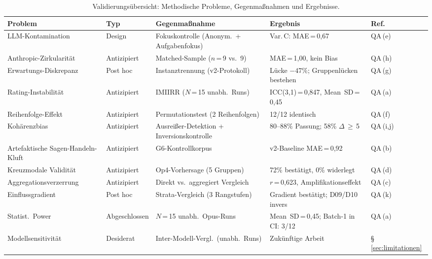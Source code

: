 \documentclass[12pt,a4paper]{article}
\begin{document}
\begin{table}[htbp]
  \centering
  \caption{Validierungsübersicht: Methodische Probleme, Gegenmaßnahmen und Ergebnisse.}
  \label{tab:validation_overview}
  \scriptsize
  \begin{tabularx}{\textwidth}{@{} L{3.2cm} l L{3.5cm} Y l @{}}
    \toprule
    \textbf{Problem} & \textbf{Typ} & \textbf{Gegenmaßnahme} & \textbf{Ergebnis} & \textbf{Ref.} \\
    \midrule
    LLM-Kontamination & Design & Fokuskontrolle (Anonym.\ + Aufgabenfokus) & Var.\,C: MAE\,=\,0,67 & QA\,(e) \\[3pt]
    Anthropic-Zirkularität & Antizipiert & Matched-Sample ($n$\,=\,9 vs.\ 9) & MAE\,=\,1,00, kein Bias & QA\,(h) \\[3pt]
    Erwartungs-Diskrepanz & Post hoc & Instanztrennung (v2-Protokoll) & Lücke $-47\%$; Gruppenlücken bestehen & QA\,(g) \\[3pt]
    Rating-Instabilität & Antizipiert & IMIIRR ($N$\,=\,15 unabh.\ Runs) & ICC(3,1)\,=\,0,847, Mean~SD\,=\,0,45 & QA\,(a) \\[3pt]
    Reihenfolge-Effekt & Antizipiert & Permutationstest (2 Reihenfolgen) & 12/12 identisch & QA\,(f) \\[3pt]
    Kohärenzbias & Antizipiert & Ausreißer-Detektion + Inversionskontrolle & 80--88\% Passung; 58\% $\Delta$\,$\geq$\,5 & QA\,(i,j) \\[3pt]
    Artefaktische Sagen-Handeln-Kluft & Antizipiert & G6-Kontrollkorpus & v2-Baseline MAE\,=\,0,92 & QA\,(b) \\[3pt]
    Kreuzmodale Validität & Antizipiert & Op4-Vorhersage (5 Gruppen) & 72\% bestätigt, 0\% widerlegt & QA\,(d) \\[3pt]
    Aggregationsverzerrung & Antizipiert & Direkt vs.\ aggregiert Vergleich & $r$\,=\,0,623, Amplifikationseffekt & QA\,(c) \\[3pt]
    Einflussgradient & Post hoc & Strata-Vergleich (3 Rangstufen) & Gradient bestätigt; D09/D10 invers & QA\,(k) \\[3pt]
    Statist.\ Power & Abgeschlossen & $N$\,=\,15 unabh.\ Opus-Runs & Mean~SD\,=\,0,45; Batch-1 in CI: 3/12 & QA\,(a) \\[3pt]
    Modellsensitivität & Desiderat & Inter-Modell-Vergl.\ (unabh.\ Runs) & Zukünftige Arbeit & \S\,\ref{sec:limitationen} \\
    \bottomrule
  \end{tabularx}
\end{table}
\end{document}
